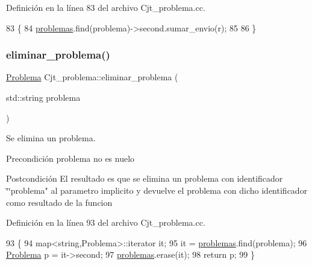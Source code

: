Definición en la línea 83 del archivo Cjt\+\_\+problema.\+cc.


\begin{DoxyCode}
83                                                      \{
84   \mbox{\hyperlink{class_cjt__problema_a2d471986320805c5b27f8d14d486fca8}{problemas}}.find(problema)->second.sumar\_envio(r);
85 
86 \}
\end{DoxyCode}
\mbox{\label{class_cjt__problema_afa2668b9e1a1bc710c29f19512399c58}} 
\subsubsection{\texorpdfstring{eliminar\+\_\+problema()}{eliminar\_problema()}}
{\footnotesize\ttfamily \mbox{\hyperlink{class_problema}{Problema}} Cjt\+\_\+problema\+::eliminar\+\_\+problema (\begin{DoxyParamCaption}\item[{std\+::string}]{problema }\end{DoxyParamCaption})}



Se elimina un problema. 

\begin{DoxyPrecond}{Precondición}
problema no es nuelo 
\end{DoxyPrecond}
\begin{DoxyPostcond}{Postcondición}
El resultado es que se elimina un problema con identificador \char`\"{}\char`\"{}problema" al parametro implicito y devuelve el problema con dicho identificador como resultado de la funcion 
\end{DoxyPostcond}


Definición en la línea 93 del archivo Cjt\+\_\+problema.\+cc.


\begin{DoxyCode}
93                                                         \{
94   map<string,Problema>::iterator it;
95   it = \mbox{\hyperlink{class_cjt__problema_a2d471986320805c5b27f8d14d486fca8}{problemas}}.find(problema);
96   \mbox{\hyperlink{class_problema}{Problema}} p = it->second;
97   \mbox{\hyperlink{class_cjt__problema_a2d471986320805c5b27f8d14d486fca8}{problemas}}.erase(it);
98   \textcolor{keywordflow}{return} p;
99 \}
\end{DoxyCode}
\mbox{\label{class_cjt__problema_ada9dc37cd22fd8065c89ef3f180beac5}} 
